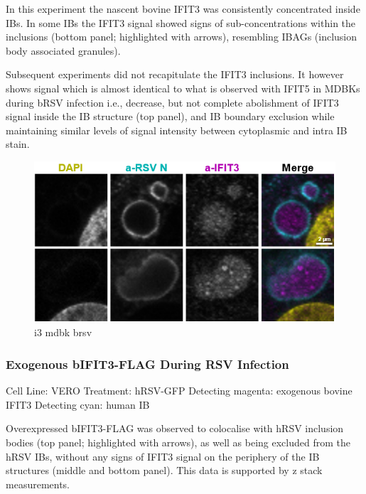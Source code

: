 In this experiment the nascent bovine IFIT3 was consistently concentrated inside IBs. In some IBs the IFIT3 signal showed signs of sub-concentrations within the inclusions (bottom panel; highlighted with arrows), resembling IBAGs (inclusion body associated granules).

Subsequent experiments did not recapitulate the IFIT3 inclusions. It however shows signal which is almost identical to what is observed with IFIT5 in MDBKs during bRSV infection i.e., decrease, but not complete abolishment of IFIT3 signal inside the IB structure (top panel), and IB boundary exclusion while maintaining similar levels of signal intensity between cytoplasmic and intra IB stain.

\begin{figure}
    \centering
    \includegraphics[width=1\linewidth]{09. Chapter 4/Figs/04. IFIT3/04. mdbk brsv.png}
    \caption[i3 mdbk brsv]{i3 mdbk brsv}
    \label{fig:i3 mdbk brsv}
\end{figure}


\subsubsection{Exogenous bIFIT3-FLAG During RSV Infection} \label{Exogenous bIFIT3-FLAG During RSV Infection}
Cell Line: VERO \newline
Treatment: hRSV-GFP \newline
Detecting magenta: exogenous bovine IFIT3 \newline
Detecting cyan: human IB \newline

Overexpressed bIFIT3-FLAG was observed to colocalise with hRSV inclusion bodies (top panel; highlighted with arrows), as well as being excluded from the hRSV IBs, without any signs of IFIT3 signal on the periphery of the IB structures (middle and bottom panel). This data is supported by z stack measurements.

